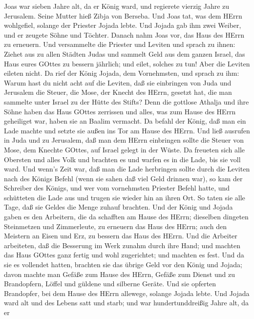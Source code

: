  Joas war sieben Jahre alt, da er König ward, und regierete
vierzig Jahre zu Jerusalem. Seine Mutter hieß Zibja von Berseba.
 Und Joas tat, was dem HErrn wohlgefiel, solange der
Priester Jojada lebte.  Und Jojada gab ihm zwei Weiber, und
er zeugete Söhne und Töchter.  Danach nahm Joas vor, das
Haus des HErrn zu erneuern.  Und versammelte die Priester
und Leviten und sprach zu ihnen: Ziehet aus zu allen Städten Judas und
sammelt Geld aus dem ganzen Israel, das Haus eures GOttes zu bessern
jährlich; und eilet, solches zu tun! Aber die Leviten eileten nicht.
 Da rief der König Jojada, dem Vornehmsten, und sprach zu
ihm: Warum hast du nicht acht auf die Leviten, daß sie einbringen von
Juda und Jerusalem die Steuer, die Mose, der Knecht des HErrn, gesetzt
hat, die man sammelte unter Israel zu der Hütte des Stifts? 
Denn die gottlose Athalja und ihre Söhne haben das Haus GOttes zerrissen
und alles, was zum Hause des HErrn geheiliget war, haben sie an Baalim
vermacht.  Da befahl der König, daß man ein Lade machte und
setzte sie außen ins Tor am Hause des HErrn.  Und ließ
ausrufen in Juda und zu Jerusalem, daß man dem HErrn einbringen sollte
die Steuer von Mose, dem Knechte GOttes, auf Israel gelegt in der Wüste.
 Da freueten sich alle Obersten und alles Volk und brachten
es und warfen es in die Lade, bis sie voll ward.  Und
wenn's Zeit war, daß man die Lade herbringen sollte durch die Leviten
nach des Königs Befehl (wenn sie sahen daß viel Geld drinnen war), so
kam der Schreiber des Königs, und wer vom vornehmsten Priester Befehl
hatte, und schütteten die Lade aus und trugen sie wieder hin an ihren
Ort. So taten sie alle Tage, daß sie Geldes die Menge zuhauf brachten.
 Und der König und Jojada gaben es den Arbeitern, die da
schafften am Hause des HErrn; dieselben dingeten Steinmetzen und
Zimmerleute, zu erneuern das Haus des HErrn; auch den Meistern an Eisen
und Erz, zu bessern das Haus des HErrn.  Und die Arbeiter
arbeiteten, daß die Besserung im Werk zunahm durch ihre Hand; und
machten das Haus GOttes ganz fertig und wohl zugerichtet; und machten es
fest.  Und da sie es vollendet hatten, brachten sie das
übrige Geld vor den König und Jojada; davon machte man Gefäße zum Hause
des HErrn, Gefäße zum Dienst und zu Brandopfern, Löffel und güldene und
silberne Geräte. Und sie opferten Brandopfer, bei dem Hause des HErrn
allewege, solange Jojada lebte.  Und Jojada ward alt und
des Lebens satt und starb; und war hundertunddreißig Jahre alt, da er
